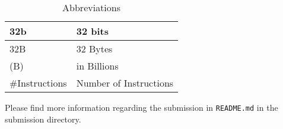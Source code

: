 \documentclass{article}
\begin{document}
\begin{table}[H]
    \centering
    \begin{tabularx}{\linewidth}{|X|X|}
        \hline
        32b & 32 bits \\
        \hline
        32B & 32 Bytes \\
        \hline
        (B) & in Billions \\
        \hline
        \#Instructions & Number of Instructions \\
        \hline
    \end{tabularx}
    \caption{Abbreviations}
    \label{tab:abbreviations}
\end{table}

Please find more information regarding the submission in \texttt{README.md} in the submission directory.
\end{document}
